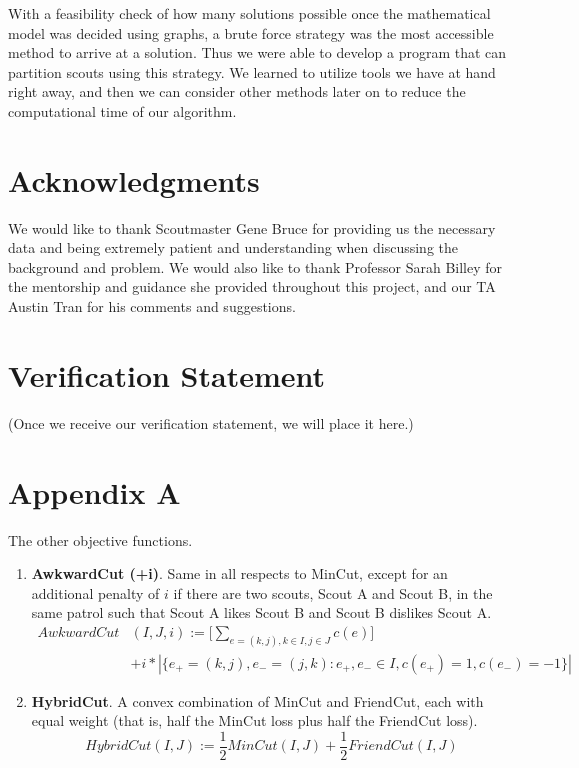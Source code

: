 \documentclass{amsart}
\theoremstyle{definition}
\theoremstyle{remark}
\numberwithin{equation}{section}
\begin{document}
With a feasibility check of how many solutions possible once the mathematical model was decided using graphs, a brute force strategy was the most accessible method to arrive at a solution. Thus we were able to develop a program that can partition scouts using this strategy. We learned to utilize tools we have at hand right away, and then we can consider other methods later on to reduce the computational time of our algorithm.

\section*{Acknowledgments}
We would like to thank Scoutmaster Gene Bruce for providing us the necessary data and being extremely patient and understanding when discussing the background and problem. We would also like to thank Professor Sarah Billey for the mentorship and guidance she provided throughout this project, and our TA Austin Tran for his comments and suggestions. 

\section*{Verification Statement}
(Once we receive our verification statement, we will place it here.)

\section*{Appendix A}
The other objective functions.

\begin{enumerate}
    \item \textbf{AwkwardCut (+i)}. Same in all respects to MinCut, except for an additional penalty of $i$ if there are two scouts, Scout A and Scout B, in the same patrol such that Scout A likes Scout B and Scout B dislikes Scout A.
    \begin{equation*}
        \begin{split}
            AwkwardCut&(I, J, i) := \Bigg[ \sum_{e = (k, j), k \in I, j \in J}^{} c(e) \Bigg] \\
            &+ i * \left\vert{\{e_+ = (k,j), e_- = (j, k) : e_+, e_- \in I, c(e_+) = 1, c(e_-) = -1\}}\right\vert
        \end{split}
    \end{equation*}

\item \textbf{HybridCut}. A convex combination of MinCut and FriendCut, each with equal weight (that is, half the MinCut loss plus half the FriendCut loss).
    \begin{equation*}
        HybridCut(I, J) := \frac{1}{2}MinCut(I, J) + \frac{1}{2}FriendCut(I, J)
    \end{equation*}
\end{enumerate}
\end{document}
